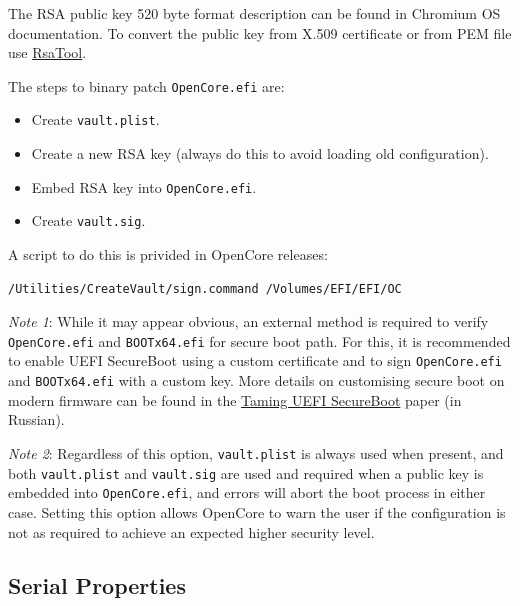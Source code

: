 \documentclass[]{article}
\providecommand{\tightlist}{%
  \setlength{\itemsep}{0pt}\setlength{\parskip}{0pt}}
\begin{document}
\begin{enumerate}
  The RSA public key 520 byte format description can be found in Chromium OS documentation.
  To convert the public key from X.509 certificate or from PEM file use
  \href{https://github.com/acidanthera/OpenCorePkg/tree/master/Utilities/CreateVault}{RsaTool}.


  The steps to binary patch \texttt{OpenCore.efi} are:

  \begin{itemize}
  \tightlist
  \item Create \texttt{vault.plist}.
  \item Create a new RSA key (always do this to avoid loading old configuration).
  \item Embed RSA key into \texttt{OpenCore.efi}.
  \item Create \texttt{vault.sig}.
  \end{itemize}

  A script to do this is privided in OpenCore releases:
\begin{lstlisting}[label=createvault, style=ocbash]
/Utilities/CreateVault/sign.command /Volumes/EFI/EFI/OC
\end{lstlisting}

  \emph{Note 1}: While it may appear obvious, an external
  method is required to verify \texttt{OpenCore.efi} and \texttt{BOOTx64.efi} for
  secure boot path. For this, it is recommended to enable UEFI SecureBoot
  using a custom certificate and to sign \texttt{OpenCore.efi} and \texttt{BOOTx64.efi}
  with a custom key. More details on customising secure boot on modern firmware
  can be found in the \href{https://habr.com/post/273497/}{Taming UEFI SecureBoot}
  paper (in Russian).

  \emph{Note 2}:  Regardless of this option, \texttt{vault.plist} is always used when
  present, and both \texttt{vault.plist} and \texttt{vault.sig} are used and required
  when a public key is embedded into \texttt{OpenCore.efi}, and errors will abort the
  boot process in either case. Setting this option allows OpenCore to warn the user if
  the configuration is not as required to achieve an expected higher security level.

\end{enumerate}

\subsection{Serial Properties}\label{miscserialprops}
\end{document}
